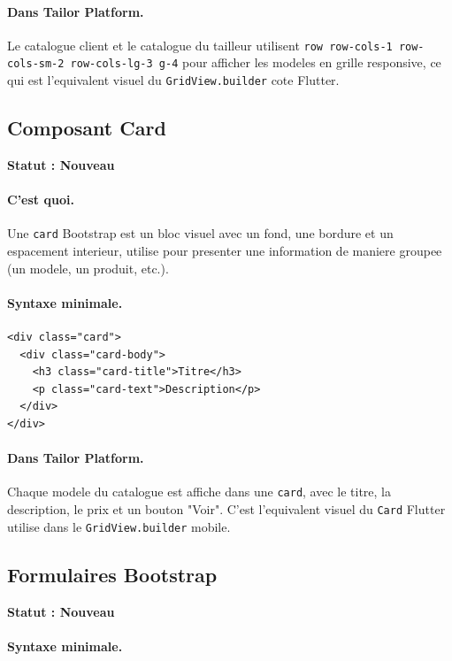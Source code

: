\documentclass[11pt,a4paper]{article}
\newcommand{\statut}[1]{\textbf{Statut : #1}}
\begin{document}
\paragraph{Dans Tailor Platform.}
Le catalogue client et le catalogue du tailleur utilisent
\verb|row row-cols-1 row-cols-sm-2 row-cols-lg-3 g-4| pour afficher les
modeles en grille responsive, ce qui est l'equivalent visuel du
\verb|GridView.builder| cote Flutter.

\subsection{Composant Card}

\statut{Nouveau}

\paragraph{C'est quoi.}
Une \verb|card| Bootstrap est un bloc visuel avec un fond, une bordure et un
espacement interieur, utilise pour presenter une information de maniere
groupee (un modele, un produit, etc.).

\paragraph{Syntaxe minimale.}

\begin{lstlisting}
<div class="card">
  <div class="card-body">
    <h3 class="card-title">Titre</h3>
    <p class="card-text">Description</p>
  </div>
</div>
\end{lstlisting}

\paragraph{Dans Tailor Platform.}
Chaque modele du catalogue est affiche dans une \verb|card|, avec le titre,
la description, le prix et un bouton "Voir". C'est l'equivalent visuel du
\verb|Card| Flutter utilise dans le \verb|GridView.builder| mobile.

\subsection{Formulaires Bootstrap}

\statut{Nouveau}

\paragraph{Syntaxe minimale.}
\end{document}
